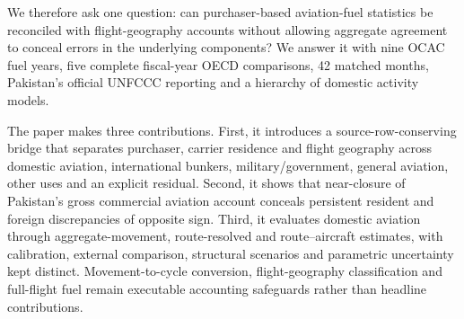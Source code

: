 We therefore ask one question: can purchaser-based aviation-fuel statistics be reconciled with
flight-geography accounts without allowing aggregate agreement to conceal errors in the
underlying components? We answer it with nine OCAC fuel years, five complete fiscal-year OECD
comparisons, 42 matched months, Pakistan's official UNFCCC reporting and a hierarchy of
domestic activity models.

The paper makes three contributions. First, it introduces a source-row-conserving bridge that
separates purchaser, carrier residence and flight geography across domestic aviation,
international bunkers, military/government, general aviation, other uses and an explicit
residual. Second, it shows that near-closure of Pakistan's gross commercial aviation account
conceals persistent resident and foreign discrepancies of opposite sign. Third, it evaluates
domestic aviation through aggregate-movement, route-resolved and route--aircraft estimates,
with calibration, external comparison, structural scenarios and parametric uncertainty kept
distinct. Movement-to-cycle conversion, flight-geography classification and full-flight fuel
remain executable accounting safeguards rather than headline contributions.
